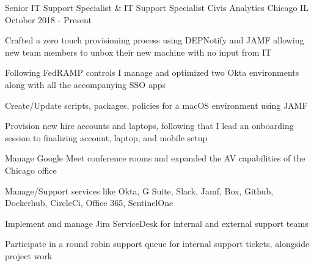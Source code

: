 

\begin{cventries}

  \cventry
  {Senior IT Support Specialist \& IT Support Specialist} %
  {Civis Analytics} %
  {Chicago IL} %
  {October 2018 - Present} %
  {
    \begin{cvitems} %
      \item {Crafted a zero touch provisioning process using DEPNotify and JAMF allowing new team members to unbox their new machine with no input from IT}
      \item {Following FedRAMP controls I manage and optimized two Okta environments along with all the accompanying SSO apps}
      \item {Create/Update scripts, packages, policies for a macOS environment using JAMF}
      \item {Provision new hire accounts and laptops, following that I lead an onboarding session to finalizing account, laptop, and mobile setup}
      \item {Manage Google Meet conference rooms and expanded the AV capabilities of the Chicago office}      
      \item {Manage/Support services like Okta, G Suite, Slack, Jamf, Box, Github, Dockerhub, CircleCi, Office 365, SentinelOne}
      \item {Implement and manage Jira ServiceDesk for internal and external support teams}
      \item {Participate in a round robin support queue for internal support tickets, alongside project work}
    \end{cvitems}
  }


\end{cventries}
